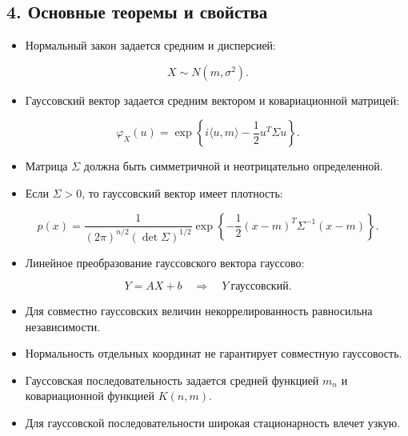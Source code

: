\documentclass[
  11pt,
  a4paper,
]{article}
\providecommand{\tightlist}{%
  \setlength{\itemsep}{0pt}\setlength{\parskip}{0pt}}
\begin{document}
\subsection{4. Основные теоремы и
свойства}\label{ux43eux441ux43dux43eux432ux43dux44bux435-ux442ux435ux43eux440ux435ux43cux44b-ux438-ux441ux432ux43eux439ux441ux442ux432ux430}

\begin{itemize}
\tightlist
\item
  Нормальный закон задается средним и дисперсией:
\end{itemize}

\[
X\sim N(m,\sigma^2).
\]

\begin{itemize}
\tightlist
\item
  Гауссовский вектор задается средним вектором и ковариационной
  матрицей:
\end{itemize}

\[
\varphi_X(u)
=
\exp\left\{i\langle u,m\rangle-\frac12u^T\Sigma u\right\}.
\]

\begin{itemize}
\tightlist
\item
  Матрица \(\Sigma\) должна быть симметричной и неотрицательно
  определенной.
\item
  Если \(\Sigma>0\), то гауссовский вектор имеет плотность:
\end{itemize}

\[
p(x)
=
\frac1{(2\pi)^{n/2}(\det\Sigma)^{1/2}}
\exp\left\{-\frac12(x-m)^T\Sigma^{-1}(x-m)\right\}.
\]

\begin{itemize}
\tightlist
\item
  Линейное преобразование гауссовского вектора гауссово:
\end{itemize}

\[
Y=AX+b
\quad\Rightarrow\quad
Y\ \text{гауссовский}.
\]

\begin{itemize}
\tightlist
\item
  Для совместно гауссовских величин некоррелированность равносильна
  независимости.
\item
  Нормальность отдельных координат не гарантирует совместную
  гауссовость.
\item
  Гауссовская последовательность задается средней функцией \(m_n\) и
  ковариационной функцией \(K(n,m)\).
\item
  Для гауссовской последовательности широкая стационарность влечет
  узкую.
\end{itemize}
\end{document}
